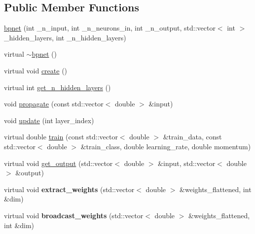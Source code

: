 \subsection*{Public Member Functions}
\begin{DoxyCompactItemize}
\item 
\hyperlink{classbpnet_adfeeece0abde65630da85276488cc0b2}{bpnet} (int \-\_\-n\-\_\-input, int \-\_\-n\-\_\-neurons\-\_\-in, int \-\_\-n\-\_\-output, std\-::vector$<$ int $>$ \-\_\-hidden\-\_\-layers, int \-\_\-n\-\_\-hidden\-\_\-layers)
\item 
virtual \hyperlink{classbpnet_a7189286dfd5cfdd648bcc8c78a177891}{$\sim$bpnet} ()
\item 
virtual void \hyperlink{classbpnet_a3731e200c3191fc77be85f1db2c2d4f9}{create} ()
\item 
virtual int \hyperlink{classbpnet_aa35c06d999256c9aebeed4f38bca9d0f}{get\-\_\-n\-\_\-hidden\-\_\-layers} ()
\item 
void \hyperlink{classbpnet_a77cd3c63e9948e4b6cc9e3a0412e25ea}{propagate} (const std\-::vector$<$ double $>$ \&input)
\item 
void \hyperlink{classbpnet_a87beae9040de4815cbcada7420f0df2a}{update} (int layer\-\_\-index)
\item 
virtual double \hyperlink{classbpnet_a653eae04b7dcfb4271421fd079849f89}{train} (const std\-::vector$<$ double $>$ \&train\-\_\-data, const std\-::vector$<$ double $>$ \&train\-\_\-class, double learning\-\_\-rate, double momentum)
\item 
virtual void \hyperlink{classbpnet_a9da604c278a2d583511071fdc754c9c6}{get\-\_\-output} (std\-::vector$<$ double $>$ \&input, std\-::vector$<$ double $>$ \&output)
\item 
\hypertarget{classbpnet_acb2e9180ca3a3e42776f3487b9a3bfe9}{virtual void {\bfseries extract\-\_\-weights} (std\-::vector$<$ double $>$ \&weights\-\_\-flattened, int \&dim)}\label{classbpnet_acb2e9180ca3a3e42776f3487b9a3bfe9}

\item 
\hypertarget{classbpnet_a2ae976225ed085139806242a7cefd84f}{virtual void {\bfseries broadcast\-\_\-weights} (std\-::vector$<$ double $>$ \&weights\-\_\-flattened, int \&dim)}\label{classbpnet_a2ae976225ed085139806242a7cefd84f}

\end{DoxyCompactItemize}
